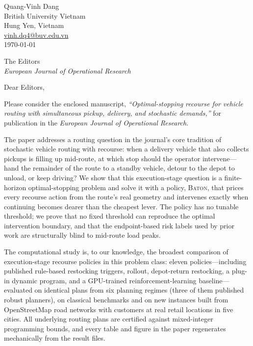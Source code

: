 \documentclass[11pt]{article}
\begin{document}
\begin{flushright}
Quang-Vinh Dang\\
British University Vietnam\\
Hung Yen, Vietnam\\
\href{mailto:vinh.dq4@buv.edu.vn}{vinh.dq4@buv.edu.vn}\\[4pt]
\today
\end{flushright}

\vspace{6pt}
\noindent
The Editors\\
\emph{European Journal of Operational Research}

\vspace{14pt}
\noindent Dear Editors,

Please consider the enclosed manuscript, \emph{``Optimal-stopping
recourse for vehicle routing with simultaneous
pickup, delivery, and stochastic demands,''} for publication in the
\emph{European Journal of Operational Research}.

The paper addresses a routing question in the journal's core
tradition of stochastic vehicle routing with recourse: when a
delivery vehicle that also collects pickups is filling up mid-route,
at which stop should the operator intervene---hand the remainder of
the route to a standby vehicle, detour to the depot to unload, or
keep driving? We show that this execution-stage question is a
finite-horizon optimal-stopping problem and solve it with a policy,
\textsc{Baton}, that prices every recourse action from the route's
real geometry and intervenes exactly when continuing becomes dearer
than the cheapest lever. The policy has no tunable threshold; we prove
that no fixed threshold can reproduce the optimal intervention
boundary, and that the endpoint-based risk labels used by prior work
are structurally blind to mid-route load peaks.

The computational study is, to our knowledge, the broadest comparison
of execution-stage recourse policies in this problem class:
eleven policies---including published rule-based restocking triggers,
rollout, depot-return restocking, a plug-in dynamic program, and a
GPU-trained reinforcement-learning baseline---evaluated on identical
plans from six planning regimes (three of them published robust
planners), on classical benchmarks and on new instances built from
OpenStreetMap road networks with customers at real retail locations in
five cities. All underlying routing plans are certified against
mixed-integer programming bounds, and every table and figure in the
paper regenerates mechanically from the result files.
\end{document}
